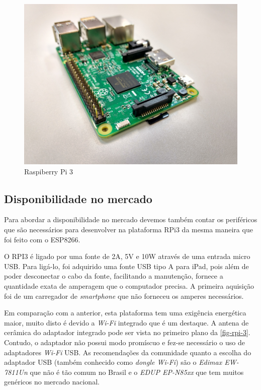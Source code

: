 \begin{figure}[htb]
	\caption{\label{fig-rpi-3}Raspiberry Pi 3 }
	\begin{center}
		\includegraphics[width=1\textwidth]{040-plataformas/RPi-WiFi-dongles/rpi-onboard.jpg}
	\end{center}
\end{figure}



\subsection{Disponibilidade no mercado}
\label{subsec:mercado-rpi}

Para abordar a disponibilidade no mercado devemos também contar os periféricos
que são necessários para desenvolver na plataforma  RPi3 da mesma maneira que
foi feito com o ESP8266.

O RPI3 é ligado por uma fonte de 2A, 5V e 10W através de uma entrada micro
USB. Para ligá-lo, foi adquirido uma fonte USB tipo A para iPad, pois além de
poder desconectar o cabo da fonte, facilitando a manutenção, fornece a
quantidade exata de amperagem que o computador precisa. A primeira aquisição foi
de um carregador de \emph{smartphone} que não forneceu os amperes necessários.

Em comparação com a anterior, esta plataforma tem uma exigência energética maior,
muito disto é devido a \emph{Wi-Fi} integrado que é um destaque.
A antena de cerâmica do adaptador integrado pode ser vista no primeiro plano da
\autoref{fig-rpi-3}. Contudo, o adaptador não possui modo promíscuo e fez-se
necessário o uso de adaptadores \emph{Wi-Fi} USB. As recomendações da comunidade
quanto a escolha do adaptador USB (também conhecido como \emph{dongle Wi-Fi})
são o \emph{Edimax EW-7811Un} que não é tão comum no Brasil e o
\emph{EDUP EP-N85xx} que tem muitos genéricos no mercado nacional.

